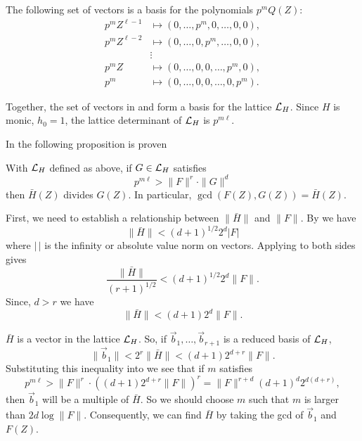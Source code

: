 The following set of vectors is a basis for the polynomials $p^m
Q(Z)$:
\begin{equation} \label{Second:LLL:Eq}
\begin{aligned}
p^m Z^{\ell -1} & \mapsto (0,  \ldots, p^m, 0, \ldots, 0, 0), \\
p^m Z^{\ell -2} & \mapsto (0,  \ldots, 0, p^m, \ldots, 0, 0), \\
& \vdots\\
p^m Z & \mapsto (0, \ldots, 0, 0, \ldots, p^m, 0), \\
p^m & \mapsto (0, \ldots, 0, 0, \ldots, 0, p^m).
\end{aligned}
\end{equation}

Together, the set of vectors in  and
 form a basis for the lattice ${\cal L}_H$.  Since 
$H$ is monic, $h_0 = 1$, the lattice determinant of ${\cal L}_H$ is $p^{m 
\ell}$. 

In \cite{LenstraAK82} the following proposition is proven

\begin{proposition}  With ${\cal L}_H$ defined as
above, if $G \in {\cal L}_H$ satisfies
\begin{equation} \label{LLL:Factor:Eq}
p^{m\ell} > \|F\|^r \cdot \|G\|^d
\end{equation}
then $\bar{H}(Z)$ divides $G(Z)$.  In particular, $\gcd(F(Z), G(Z)) =
\bar{H}(Z)$.
\end{proposition}

First, we need to establish a relationship between $\|\bar{H}\|$ and
$\|F\|$.  By  we have
\[
\|\bar{H}\| < (d+1)^{1/2} 2^d |F|
\]
where $|\,|$ is the infinity or absolute value norm on vectors.
Applying  to both sides gives
\[
\frac{\|\bar{H}\|}{(r+1)^{1/2}} <  (d+1)^{1/2} 2^d \|F\|.
\]
Since, $d > r$ we have
\begin{equation} \label{Factor:2Norm:Eq}
\|\bar{H}\| < (d+1) 2^d \|F\|.
\end{equation}

$\bar{H}$ is a vector in the lattice ${\cal L}_H$.  So, if $\vec{b}_1,
\ldots, \vec{b}_{r+1}$ is a reduced basis of ${\cal L}_H$, 
\[
\|\vec{b}_1\| < 2^r \| \bar{H} \| < (d+1) 2^{d+r} \|F\|.
\]
Substituting this inequality into  we see that
if $m$ satisfies
\[
p^{m\ell} > \|F\|^r \cdot \left( (d+1) 2^{d+r} \|F\|\right)^r
 = \|F\|^{r+d} (d+1)^d 2^{d(d+r)},
\]
then $\vec{b}_1$ will be a multiple of $\bar{H}$.  So we should choose
$m$ such that $m$ is larger than $2d \log \|F\|$.  Consequently, we can
find $\bar{H}$ by taking the {\sc gcd} of $\vec{b}_1$ and $F(Z)$.

